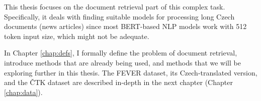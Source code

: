 This thesis focuses on the document retrieval part of this complex task.
Specifically, it deals with finding suitable models for processing long Czech documents (news articles) since most BERT-based NLP models work with 512 token input size, which might not be adequate.

In Chapter \ref{chap:defs}, I formally define the problem of document retrieval, introduce methods that are already being used, and methods that we will be exploring further in this thesis. 
The FEVER dataset, its Czech-translated version, and the ČTK dataset are described in-depth in the next chapter (Chapter \ref{chap:data}).
